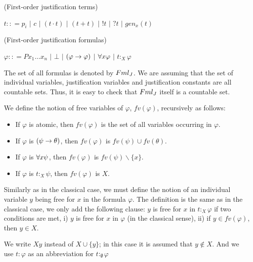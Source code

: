 \begin{defn} (First-order justification terms)
	\begin{center}
		$ t :: = p_{i}$   $|$ $c$ $|$  $(t \cdot t)$ $|$ $(t + t)$ $|$  $!t$ $|$ $?t$ $|$ $gen_{x}(t)$
	\end{center}
\end{defn}

\begin{defn} (First-order justification formulas)
	\begin{center}
		$ \varphi :: = Px_1 \dots x_n$   $|$ $\bot$ $|$  $(\varphi \rightarrow \varphi)$ $|$ $\forall x \varphi$ $|$  $t$$:_{X}$$\varphi$
	\end{center}
\end{defn}


\qquad The set of all formulas is denoted by $Fml_{J}$. We are assuming that the set of individual variables, justification variables and justification constants are all countable sets. Thus, it is easy to check that $Fml_{J}$ itself is a countable set. 

\begin{defn}
	We define the notion of free variables of $\varphi$, $fv(\varphi)$, recursively as follows:
	
	\begin{itemize} 
		\item If $\varphi$ is atomic, then $fv(\varphi)$ is the set of all variables occurring in $\varphi$.
		\item If $\varphi$ is $(\psi \rightarrow \theta)$, then $fv(\varphi)$ is $fv(\psi) \cup fv(\theta)$.
		\item If $\varphi$ is $\forall x \psi$, then $fv(\varphi)$ is $fv(\psi) \backslash \{x\}$.
		\item If $\varphi$ is $t$$:_{X}$$\psi$, then  $fv(\varphi)$ is $X$.
	\end{itemize}
	
	
	\qquad Similarly as in the classical case, we must define the notion of an individual variable $y$ being free for $x$ in the formula $\varphi$. The definition is the same as in the classical case, we only add the following clause: $y$ is free for $x$ in $t$$:_{X}$$\varphi$ if two conditions are met, i) $y$ is free for $x$ in $\varphi$ (in the classical sense), ii) if $y \in fv(\varphi)$, then $y \in X$.
\end{defn}

\qquad We write $Xy$ instead of $X \cup \{y\}$; in this case it is assumed that $y \notin X$. And we use $t$$:$$\varphi$ as an abbreviation for $t$$:_{\emptyset}$$\varphi$

